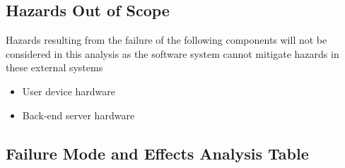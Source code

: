 \documentclass{article}
\begin{document}
\subsection{Hazards Out of Scope}

Hazards resulting from the failure of the following components will not be considered in this analysis as the software system cannot mitigate hazards in these external systems 
\begin{itemize}
    \item User device hardware
    \item Back-end server hardware
\end{itemize}


\subsection{Failure Mode and Effects Analysis Table}
\end{document}
